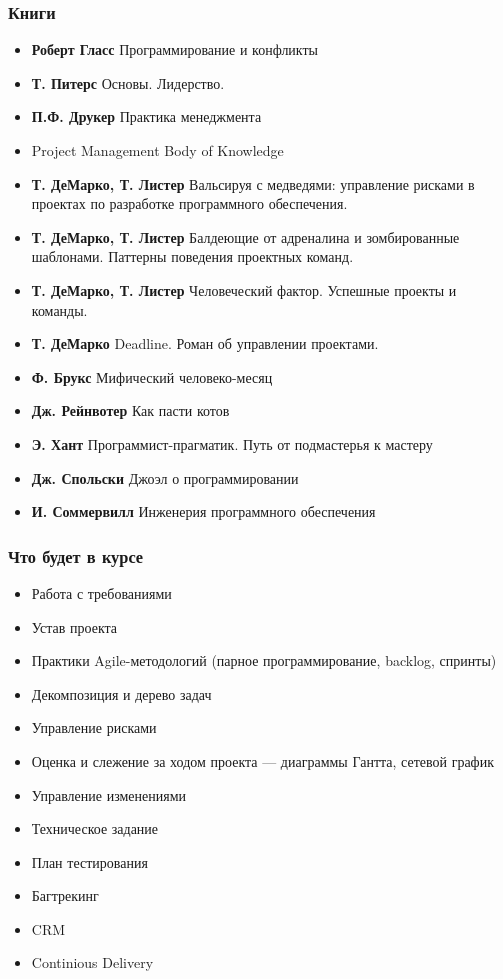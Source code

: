 \documentclass[xetex,mathserif,serif]{beamer}
\begin{document}
	\begin{frame}
		\frametitle{Книги}
		\begin{footnotesize}
			\begin{itemize}
				\item \textbf{Роберт Гласс} Программирование и конфликты
				\item \textbf{Т. Питерс} Основы. Лидерство.
				\item \textbf{П.Ф. Друкер} Практика менеджмента
				\item Project Management Body of Knowledge
				\item \textbf{Т. ДеМарко, Т. Листер} Вальсируя с медведями: управление рисками в проектах по разработке программного обеспечения.
				\item \textbf{Т. ДеМарко, Т. Листер} Балдеющие от адреналина и зомбированные шаблонами. Паттерны поведения проектных команд.
				\item \textbf{Т. ДеМарко, Т. Листер} Человеческий фактор. Успешные проекты и команды.
				\item \textbf{Т. ДеМарко} Deadline. Роман об управлении проектами.
				\item \textbf{Ф. Брукс} Мифический человеко-месяц
				\item \textbf{Дж. Рейнвотер} Как пасти котов
				\item \textbf{Э. Хант} Программист-прагматик. Путь от подмастерья к мастеру
				\item \textbf{Дж. Спольски} Джоэл о программировании
				\item \textbf{И. Соммервилл} Инженерия программного обеспечения
			\end{itemize}
		\end{footnotesize}
	\end{frame}

	\begin{frame}
		\frametitle{Что будет в курсе}
		\begin{footnotesize}
			\begin{itemize}
				\item Работа с требованиями
				\item Устав проекта
				\item Практики Agile-методологий (парное программирование, backlog, спринты)
				\item Декомпозиция и дерево задач
				\item Управление рисками
				\item Оценка и слежение за ходом проекта --- диаграммы Гантта, сетевой график
				\item Управление изменениями
				\item Техническое задание
				\item План тестирования
				\item Багтрекинг
				\item CRM
				\item Continious Delivery
			\end{itemize}
		\end{footnotesize}
	\end{frame}
\end{document}
